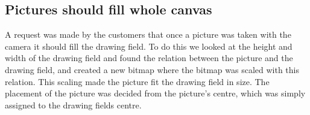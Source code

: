 \subsection{Pictures should fill whole canvas}
A request was made by the customers that once a picture was taken with the camera it should fill the drawing field.
To do this we looked at the height and width of the drawing field and found the relation between the picture and the drawing field, and created a new bitmap where the bitmap was scaled with this relation.
This scaling made the picture fit the drawing field in size.
The placement of the picture was decided from the picture's centre, which was simply assigned to the drawing fields centre.